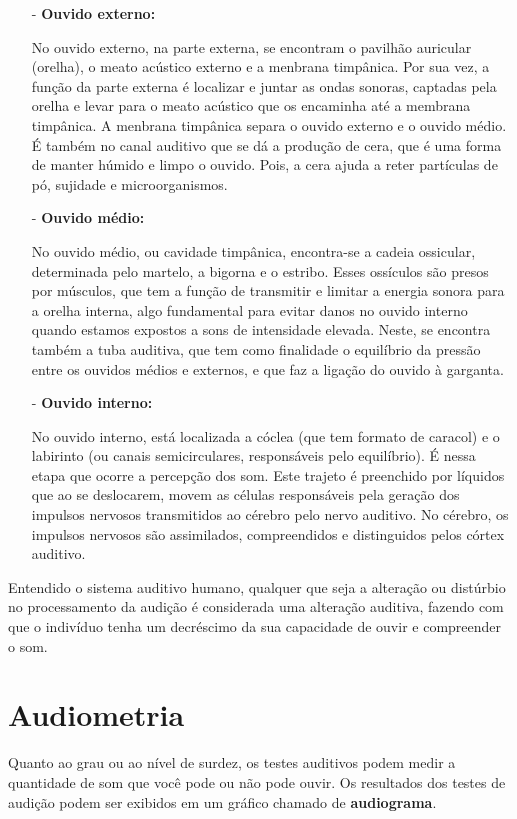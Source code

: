 \documentclass[brasil]{abnt}
\begin{document}
				\begin{itemize}		
					\item [-]\textbf{Ouvido externo:}
					
					{ No ouvido externo, na parte externa, se encontram o pavilhão auricular (orelha), o meato acústico externo e a menbrana timpânica. Por sua vez, a função da parte externa é localizar e 
					juntar as ondas sonoras, captadas pela orelha e levar para o meato acústico que os encaminha até a membrana timpânica. A menbrana timpânica separa o ouvido externo e o ouvido médio.
					É também no canal auditivo que se dá a produção de cera, que é uma forma de manter húmido e limpo o ouvido. Pois, a cera ajuda a reter partículas de pó, sujidade e microorganismos.} 
			
					\item[-]\textbf{Ouvido médio:}
					
					{ No ouvido médio, ou cavidade timpânica, encontra-se a cadeia ossicular, determinada pelo martelo, a bigorna e o estribo. Esses ossículos são presos por músculos, que tem a função de 
					transmitir e limitar a energia sonora para a orelha interna, algo fundamental para evitar danos no ouvido interno quando estamos expostos a sons de intensidade elevada. Neste, se 
					encontra também a tuba auditiva, que tem como finalidade o equilíbrio da pressão entre os ouvidos médios e externos, e que faz a ligação do ouvido à garganta.}
					
					\item[-]\textbf{Ouvido interno:}
					
					{ No ouvido interno, está localizada a cóclea (que tem formato de caracol) e o labirinto (ou canais semicirculares, responsáveis pelo equilíbrio). É nessa etapa que ocorre a percepção dos som.
					Este trajeto é preenchido por líquidos que ao se deslocarem, movem as células responsáveis pela geração dos impulsos nervosos transmitidos ao cérebro pelo nervo auditivo. No cérebro, os impulsos 
					nervosos são assimilados, compreendidos e distinguidos pelos córtex auditivo.}				
				\end{itemize}
				
			Entendido o sistema auditivo humano, qualquer que seja a alteração ou distúrbio no processamento da audição é considerada uma alteração auditiva, fazendo com que o indivíduo tenha um decréscimo da 
			sua capacidade de ouvir e compreender o som.

\chapter{Audiometria}
	Quanto ao grau ou ao nível de surdez, os testes auditivos podem medir a quantidade de som que você pode ou não pode ouvir. 
	Os resultados dos testes de audição podem ser exibidos em um gráfico chamado de \textbf{audiograma}.
\end{document}
